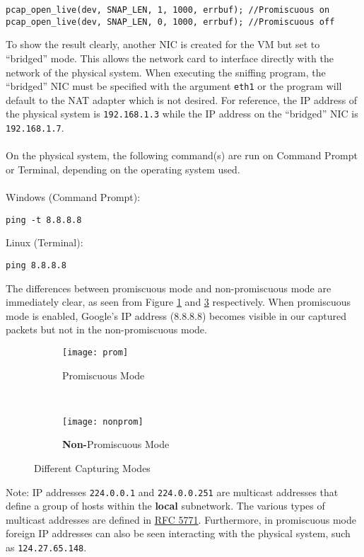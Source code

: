 \documentclass[a4paper,12pt]{article}
\begin{document}
\begin{verbatim}
pcap_open_live(dev, SNAP_LEN, 1, 1000, errbuf); //Promiscuous on
pcap_open_live(dev, SNAP_LEN, 0, 1000, errbuf); //Promiscuous off
\end{verbatim}
To show the result clearly, another NIC is created for the VM but set to ``bridged'' mode. This allows the network card to interface directly with the network of the physical system. When executing the sniffing program, the ``bridged'' NIC must be specified with the argument \texttt{eth1} or the program will default to the NAT adapter which is not desired. For reference, the IP address of the physical system is \texttt{192.168.1.3} while the IP address on the ``bridged'' NIC is \texttt{192.168.1.7}. \\\\On the physical system, the following command(s) are run on Command Prompt or Terminal, depending on the operating system used.\\\\
Windows (Command Prompt):
\begin{verbatim}
ping -t 8.8.8.8
\end{verbatim}
Linux (Terminal):
\begin{verbatim}
ping 8.8.8.8
\end{verbatim}
The differences between promiscuous mode and non-promiscuous mode are immediately clear, as seen from Figure \ref{fig:prom} and \ref{fig:nonprom} respectively. When promiscuous mode is enabled, Google's IP address (8.8.8.8) becomes visible in our captured packets but not in the non-promiscuous mode.
\begin{figure}[H]
    \centering
\begin{subfigure}[H]{0.45\textwidth}
\centering
\texttt{[image: prom]}
\caption{Promiscuous Mode}
\label{fig:prom}
\end{subfigure}
~
\begin{subfigure}[H]{0.45\textwidth}
\centering
\texttt{[image: nonprom]}
\caption{\textbf{Non-}Promiscuous Mode}
\label{fig:nonprom}
\end{subfigure}
    \caption{Different Capturing Modes}
\end{figure}
\noindent *Note: IP addresses \texttt{224.0.0.1} and \texttt{224.0.0.251} are multicast addresses that define a group of hosts within the \textbf{local} subnetwork. The various types of multicast addresses are defined in \href{https://tools.ietf.org/html/rfc5771}{RFC 5771}. Furthermore, in promiscuous mode foreign IP addresses can also be seen interacting with the physical system, such as \texttt{124.27.65.148}.
\end{document}
